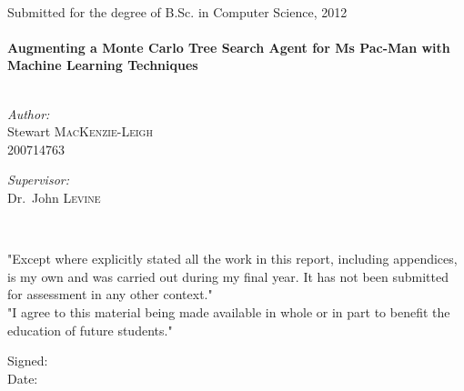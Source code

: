 \begin{titlepage}
\begin{center}

~
\vspace{3cm}

Submitted for the degree of B.Sc. in Computer Science, 2012\\[0.5cm]

\HRule \\[0.4cm]

{ \huge \bfseries Augmenting a Monte Carlo Tree Search Agent for Ms Pac-Man with Machine Learning Techniques}\\[0.4cm]

\HRule \\[1.5cm]

\begin{minipage}{0.4\textwidth}
\begin{flushleft} \large
\emph{Author:}\\
Stewart \textsc{MacKenzie-Leigh}\\
200714763
\end{flushleft}
\end{minipage}
\begin{minipage}{0.4\textwidth}
\begin{flushright} \large
\emph{Supervisor:} \\
Dr.~John \textsc{Levine}
\end{flushright}
\end{minipage} \\[2cm]

\end{center}

"Except where explicitly stated all the work in this report, including appendices, is my own and was carried out during my final year. It has not been submitted for assessment in any other context."\\

"I agree to this material being made available in whole or in part to benefit the education of future students." \\[0.5cm]

\begin{flushleft}
Signed: \\[0.5cm]
Date:
\end{flushleft}

\end{titlepage}
